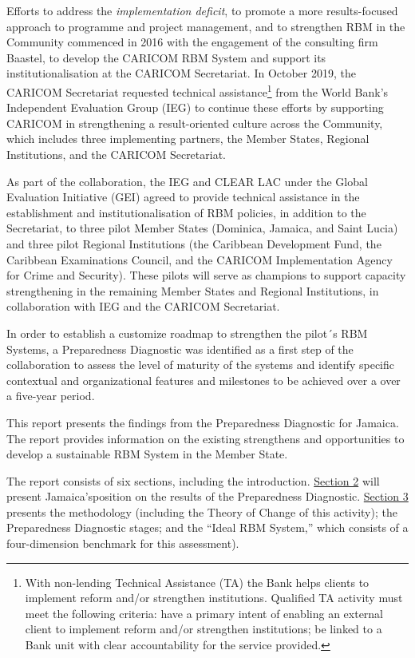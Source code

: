 \documentclass[
  10pt,
]{book}
\begin{document}
Efforts to address the \emph{implementation deficit}, to promote a more results-focused approach to programme and project management, and to strengthen RBM in the Community commenced in 2016 with the engagement of the consulting firm Baastel, to develop the CARICOM RBM System and support its institutionalisation at the CARICOM Secretariat. In October 2019, the CARICOM Secretariat requested technical assistance\footnote{With non-lending Technical Assistance (TA) the Bank helps clients to implement reform and/or strengthen institutions. Qualified TA activity must meet the following criteria: have a primary intent of enabling an external client to implement reform and/or strengthen institutions; be linked to a Bank unit with clear accountability for the service provided.} from the World Bank's Independent Evaluation Group (IEG) to continue these efforts by supporting CARICOM in strengthening a result-oriented culture across the Community, which includes three implementing partners, the Member States, Regional Institutions, and the CARICOM Secretariat.

As part of the collaboration, the IEG and CLEAR LAC under the Global Evaluation Initiative (GEI) agreed to provide technical assistance in the establishment and institutionalisation of RBM policies, in addition to the Secretariat, to three pilot Member States (Dominica, Jamaica, and Saint Lucia) and three pilot Regional Institutions (the Caribbean Development Fund, the Caribbean Examinations Council, and the CARICOM Implementation Agency for Crime and Security). These pilots will serve as champions to support capacity strengthening in the remaining Member States and Regional Institutions, in collaboration with IEG and the CARICOM Secretariat.

In order to establish a customize roadmap to strengthen the pilot´s RBM Systems, a Preparedness Diagnostic was identified as a first step of the collaboration to assess the level of maturity of the systems and identify specific contextual and organizational features and milestones to be achieved over a over a five-year period.

This report presents the findings from the Preparedness Diagnostic for Jamaica. The report provides information on the existing strengthens and opportunities to develop a sustainable RBM System in the Member State.

The report consists of six sections, including the introduction. \protect\hyperlink{section2}{Section 2} will present Jamaica'sposition on the results of the Preparedness Diagnostic. \protect\hyperlink{section3}{Section 3} presents the methodology (including the Theory of Change of this activity); the Preparedness Diagnostic stages; and the ``Ideal RBM System,'' which consists of a four-dimension benchmark for this assessment).
\end{document}
